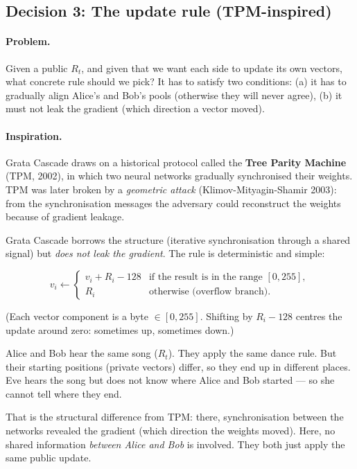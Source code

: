 \documentclass[11pt,a4paper]{article}
\begin{document}
\subsection{Decision 3: The update rule (TPM-inspired)}\label{pop:design-update}

\paragraph{Problem.} Given a public $R_t$, and given that we want each side to update its own vectors, what concrete rule should we pick? It has to satisfy two conditions: (a) it has to gradually align Alice's and Bob's pools (otherwise they will never agree), (b) it must not leak the gradient (which direction a vector moved).

\paragraph{Inspiration.} Grata Cascade draws on a historical protocol called the \textbf{Tree Parity Machine} (TPM, 2002), in which two neural networks gradually synchronised their weights. TPM was later broken by a \emph{geometric attack} (Klimov-Mityagin-Shamir 2003): from the synchronisation messages the adversary could reconstruct the weights because of gradient leakage.

Grata Cascade borrows the structure (iterative synchronisation through a shared signal) but \emph{does not leak the gradient}. The rule is deterministic and simple:

\[
v_i \gets \begin{cases} v_i + R_i - 128 & \text{if the result is in the range } [0, 255], \\ R_i & \text{otherwise (overflow branch)}. \end{cases}
\]

(Each vector component is a byte $\in [0, 255]$. Shifting by $R_i - 128$ centres the update around zero: sometimes up, sometimes down.)

\begin{aha}
Alice and Bob hear the same song ($R_t$). They apply the same dance rule. But their starting positions (private vectors) differ, so they end up in different places. Eve hears the song but does not know where Alice and Bob started --- so she cannot tell where they end.
\end{aha}

That is the structural difference from TPM: there, synchronisation between the networks revealed the gradient (which direction the weights moved). Here, no shared information \emph{between Alice and Bob} is involved. They both just apply the same public update.
\end{document}

